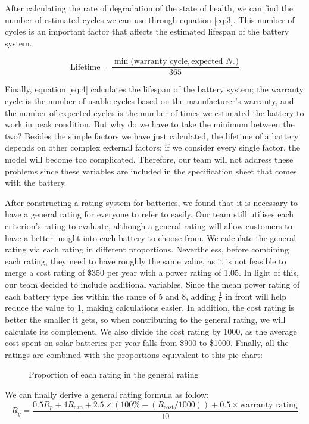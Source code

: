 After calculating the rate of degradation of the state of health, we can find the number of estimated cycles we can use through equation \eqref{eq:3}. This number of cycles is an important factor that affects the estimated lifespan of the battery system.

\begin{equation}
    \text{Lifetime} = \frac{\min{(\text{warranty cycle}, \text{expected }}N_c)}{365}\label{eq:4}
\end{equation}

Finally, equation \eqref{eq:4} calculates the lifespan of the battery system; the warranty cycle is the number of usable cycles based on the manufacturer's warranty, and the number of expected cycles is the number of times we estimated the battery to work in peak condition. But why do we have to take the minimum between the two? Besides the simple factors we have just calculated, the lifetime of a battery depends on other complex external factors; if we consider every single factor, the model will become too complicated. Therefore, our team will not address these problems since these variables are included in the specification sheet that comes with the battery.

After constructing a rating system for batteries, we found that it is necessary to have a general rating for everyone to refer to easily. Our team still utilises each criterion's rating to evaluate, although a general rating will allow customers to have a better insight into each battery to choose from. We calculate the general rating via each rating in different proportions. Nevertheless, before combining each rating, they need to have roughly the same value, as it is not feasible to merge a cost rating of \$350 per year with a power rating of 1.05. In light of this, our team decided to include additional variables. Since the mean power rating of each battery type lies within the range of 5 and 8, adding $\frac{1}{6}$ in front will help reduce the value to 1, making calculations easier. In addition, the cost rating is better the smaller it gets, so when contributing to the general rating, we will calculate its complement. We also divide the cost rating by 1000, as the average cost spent on solar batteries per year falls from \$900 to \$1000. Finally, all the ratings are combined with the proportions equivalent to this pie chart:

\begin{figure}[ht]
    \centering
    \caption{Proportion of each rating in the general rating}
\end{figure}

We can finally derive a general rating formula as follow:
\begin{equation}
    R_g = \frac{0.5R_p + 4R_\text{cap} + 2.5 \times (100\% - (R_\text{cost} / 1000)) + 0.5 \times \text{warranty rating}}{10}
\end{equation}